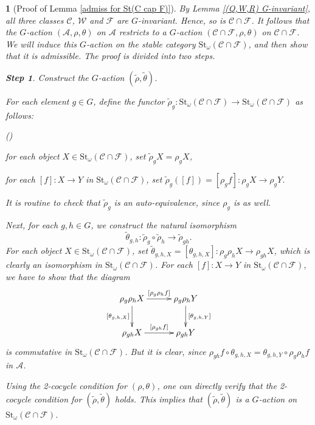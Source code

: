 \documentclass[12pt,twoside]{amsart}
\theoremstyle{bfupright head,slanted body}
\theoremstyle{bfupright head,upright body}
\newtheorem{bfhpg}[res]{}               \newtheorem*{bfhpg*}{}
\theoremstyle{fixed bf head,slanted body}
\theoremstyle{fixed bf head,upright body}
\theoremstyle{numbered paragraph}
\newlength{\thmlistleft}        %
\newlength{\thmlistright}       %
\newlength{\thmlistpartopsep}   %
\newlength{\thmlisttopsep}      %
\newlength{\thmlistparsep}      %
\newlength{\thmlistitemsep}     %
\newcounter{rqm}
\newenvironment{rqm}{\begin{list}{\upshape (\arabic{rqm})}%
    {\usecounter{rqm}%
      \setlength{\leftmargin}{\thmlistleft}%
      \setlength{\labelwidth}{\thmlistleft}%
      \setlength{\rightmargin}{\thmlistright}%
      \setlength{\partopsep}{\thmlistpartopsep}%
      \setlength{\topsep}{\thmlisttopsep}%
      \setlength{\parsep}{\thmlistparsep}%
      \setlength{\itemsep}{\thmlistitemsep}}}%
  {\end{list}}%
\numberwithin{equation}{res}
\newcommand{\calC}{\mathcal{C}}
\newcommand{\calW}{\mathcal{W}}
\newcommand{\calF}{\mathcal{F}}
\newcommand{\calA}{\mathcal{A}}
\newcommand{\St}{\mathrm{St}}
\begin{document}
\begin{bfhpg}[Proof of Lemma \ref{admiss for St(C cap F)}]\label{pf of lem 3.7}
By Lemma \ref{(Q,W,R) G-invariant}, all three classes $\calC$, $\calW$ and $\calF$ are $G$-invariant.
Hence, so is $\calC \cap \calF$.
It follows that the $G$-action $(\calA, \rho, \theta)$ on $\calA$ restricts to a $G$-action $(\calC \cap \calF, \rho, \theta)$ on $\calC \cap \calF$.
We will induce this $G$-action on the stable category $\St_\omega(\calC \cap \calF)$, and then show that it is admissible.
The proof is divided into two steps.

\vspace{1ex}\textbf{Step 1}. Construct the $G$-action $(\widetilde{\rho}, \widetilde{\theta})$.

For each element $g \in G$, define the functor $\widetilde{\rho}_g : \St_\omega(\calC \cap \calF) \to \St_\omega(\calC \cap \calF)$ as follows:
\begin{rqm}
\item[$\bullet$]
for each object $X \in \St_\omega(\calC \cap \calF)$, set $\widetilde{\rho}_g X = \rho_g X$,
\item[$\bullet$]
for each $[f] : X \to Y$ in $\St_\omega(\calC \cap \calF)$, set
$\widetilde{\rho}_g([f]) = [\rho_g f] : \rho_g X \to \rho_g Y$.
\end{rqm}
It is routine to check that $\widetilde{\rho}_g$ is an auto-equivalence, since $\rho_g$ is as well.

Next, for each $g, h \in G$, we construct the natural isomorphism
\[
\widetilde{\theta}_{g, h} : \widetilde{\rho}_g \circ \widetilde{\rho}_h \to \widetilde{\rho}_{gh}.
\]
For each object $X \in \St_\omega(\calC \cap \calF)$, set $\widetilde{\theta}_{g, h, X} = [\theta_{g, h, X}] : \rho_g \rho_h X \to \rho_{gh} X$, which is clearly an isomorphism in $\St_\omega(\calC \cap \calF)$.
For each $[f] : X \to Y$ in $\St_\omega(\calC \cap \calF)$, we have to show that the diagram
\[
\xymatrix@C=1CM{
   \rho_g \rho_h X
\ar[d]_-{[\theta_{g,h,X}]}
\ar[r]^-{[\rho_g \rho_h f]}
&  \rho_g \rho_h Y
\ar[d]^-{[\theta_{g,h,Y}]}      \\
   \rho_{gh} X
\ar[r]^-{[\rho_{gh} f]}
&  \rho_{gh} Y                                       }
\]
is commutative in $\St_\omega(\calC \cap \calF)$.
But it is clear, since $\rho_{gh} f \circ \theta_{g, h, X} = \theta_{g, h, Y} \circ \rho_g \rho_h f$ in $\calA$.

Using the 2-cocycle condition for $(\rho, \theta)$,
one can directly verify that the 2-cocycle condition for $(\widetilde{\rho}, \widetilde{\theta})$ holds.
This implies that $(\widetilde{\rho}, \widetilde{\theta})$ is a $G$-action on $\St_\omega(\calC \cap \calF)$.


\end{bfhpg}
\end{document}
